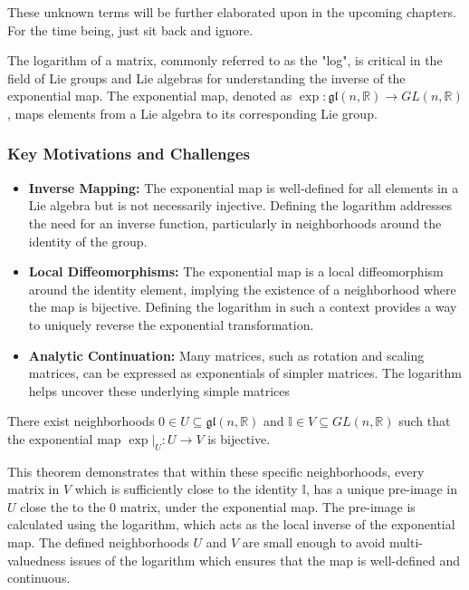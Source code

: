 \documentclass{article}
\begin{document}
These unknown terms will be further elaborated upon in the upcoming chapters. For the time being, just sit back and ignore. 

The logarithm of a matrix, commonly referred to as the "log", is critical in the field of Lie groups and Lie algebras for understanding the inverse of the exponential map. The exponential map, denoted as \(\exp: \mathfrak{gl}(n, \mathbb{R}) \rightarrow GL(n, \mathbb{R})\), maps elements from a Lie algebra to its corresponding Lie group.

\subsubsection*{Key Motivations and Challenges}
\begin{itemize}
    \item \textbf{Inverse Mapping:} The exponential map is well-defined for all elements in a Lie algebra but is not necessarily injective. Defining the logarithm addresses the need for an inverse function, particularly in neighborhoods around the identity of the group.
    \item \textbf{Local Diffeomorphisms:} The exponential map is a local diffeomorphism around the identity element, implying the existence of a neighborhood where the map is bijective. Defining the logarithm in such a context provides a way to uniquely reverse the exponential transformation.
    \item \textbf{Analytic Continuation:} Many matrices, such as rotation and scaling matrices, can be expressed as exponentials of simpler matrices. The logarithm helps uncover these underlying simple matrices
\end{itemize}

\begin{theorem}
    There exist neighborhoods \( 0 \in U \subseteq \mathfrak{gl}(n, \mathbb{R})\) and \( \mathbb{I} \in V \subseteq GL(n, \mathbb{R}) \) such that the exponential map \(\exp|_U: U \to V\) is bijective.    
\end{theorem}
This theorem demonstrates that within these specific neighborhoods, every matrix in \( V \) which is sufficiently close to the identity \( \mathbb{I} \), has a unique pre-image in \( U \) close the to the \( 0 \) matrix, under the exponential map. The pre-image is calculated using the logarithm, which acts as the local inverse of the exponential map. The defined neighborhoods \( U \) and \( V \) are small enough to avoid multi-valuedness issues of the logarithm which ensures that the map is well-defined and continuous.
\end{document}

